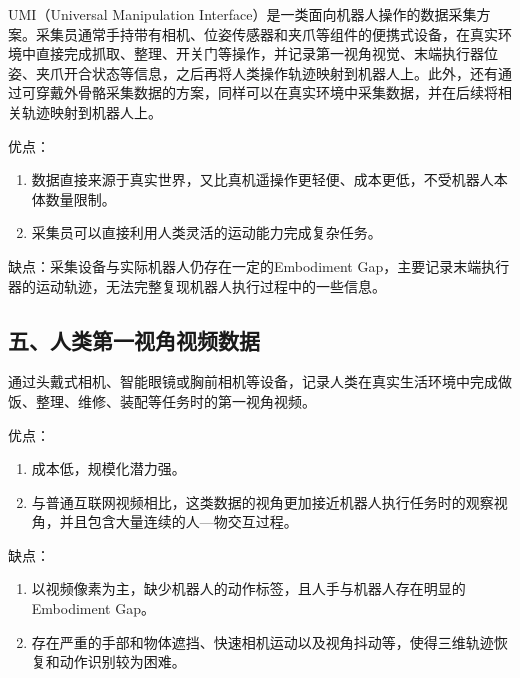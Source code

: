 UMI（Universal Manipulation Interface）是一类面向机器人操作的数据采集方案。采集员通常手持带有相机、位姿传感器和夹爪等组件的便携式设备，在真实环境中直接完成抓取、整理、开关门等操作，并记录第一视角视觉、末端执行器位姿、夹爪开合状态等信息，之后再将人类操作轨迹映射到机器人上。此外，还有通过可穿戴外骨骼采集数据的方案，同样可以在真实环境中采集数据，并在后续将相关轨迹映射到机器人上。

优点：

\begin{enumerate}
\def\labelenumi{\arabic{enumi}.}
\item
  数据直接来源于真实世界，又比真机遥操作更轻便、成本更低，不受机器人本体数量限制。
\item
  采集员可以直接利用人类灵活的运动能力完成复杂任务。
\end{enumerate}

缺点：采集设备与实际机器人仍存在一定的Embodiment Gap，主要记录末端执行器的运动轨迹，无法完整复现机器人执行过程中的一些信息。

\hypertarget{ux4e94ux4ebaux7c7bux7b2cux4e00ux89c6ux89d2ux89c6ux9891ux6570ux636e}{%
\subsection{五、人类第一视角视频数据}\label{ux4e94ux4ebaux7c7bux7b2cux4e00ux89c6ux89d2ux89c6ux9891ux6570ux636e}}

通过头戴式相机、智能眼镜或胸前相机等设备，记录人类在真实生活环境中完成做饭、整理、维修、装配等任务时的第一视角视频。

优点：

\begin{enumerate}
\def\labelenumi{\arabic{enumi}.}
\item
  成本低，规模化潜力强。
\item
  与普通互联网视频相比，这类数据的视角更加接近机器人执行任务时的观察视角，并且包含大量连续的人---物交互过程。
\end{enumerate}

缺点：

\begin{enumerate}
\def\labelenumi{\arabic{enumi}.}
\item
  以视频像素为主，缺少机器人的动作标签，且人手与机器人存在明显的Embodiment Gap。
\item
  存在严重的手部和物体遮挡、快速相机运动以及视角抖动等，使得三维轨迹恢复和动作识别较为困难。
\end{enumerate}

